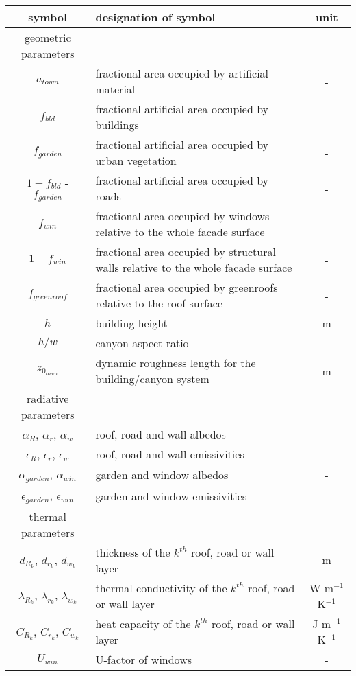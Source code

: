\begin{table}

{\footnotesize{
\begin{tabular}{c l c}
\hline
symbol                             & designation of symbol & unit    \\
\hline 
geometric parameters && \\
\hline
$a_{town}$                & fractional area occupied by artificial material &  - \\
$f_{bld}$                 & fractional artificial area occupied by buildings &  - \\
$f_{garden}$              & fractional artificial area occupied by urban vegetation &  - \\
$1 - f_{bld}$ - $f_{garden}$           & fractional artificial area occupied by roads     & - \\
$f_{win}$                 & fractional area occupied by windows relative to the whole facade surface&  - \\
$1- f_{win}$              & fractional area occupied by structural walls relative to the whole facade surface&  - \\
$f_{greenroof}$                 & fractional area occupied by greenroofs relative to the roof surface&  - \\
$h$                       & building height                       & m \\
$h/w$                     & canyon aspect ratio             & - \\
$z_{0_{town}}$            & dynamic roughness length for the
building/canyon system                                          & m \\
\hline
radiative parameters && \\
\hline
$\alpha_R$, $\alpha_r$, $\alpha_w$                & roof, road and wall albedos & - \\
$\epsilon_R$, $\epsilon_r$, $\epsilon_w$            &roof, road and wall emissivities                      & - \\
$\alpha_{garden}$, $\alpha_{win}$               & garden and window albedos & - \\
$\epsilon_{garden}$, $\epsilon_{win}$           & garden and window emissivities                      & - \\
\hline
thermal parameters && \\
\hline
$d_{R_k}$, $d_{r_k}$, $d_{w_k}$ & thickness of the $k^{th}$ roof, road or wall layer & m \\
$\lambda_{R_k}$, $\lambda_{r_k}$, $\lambda_{w_k}$          & thermal conductivity of the $k^{th}$ roof, road or wall layer & W m$^{-1}$ K$^{-1}$\\
$C_{R_k}$, $C_{r_k}$, $C_{w_k}$                 & heat capacity of the $k^{th}$ roof, road or wall layer & J m$^{-1}$ K$^{-1}$\\
$U_{win}$ & U-factor of windows & - \\
\hline
\end{tabular}
}}


\end{table}

